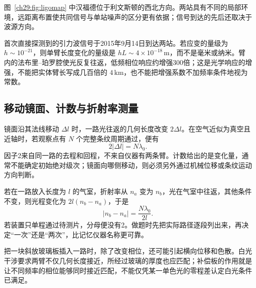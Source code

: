 图~\ref{ch29:fig:ligomap} 中汉福德位于利文斯顿的西北方向。两站具有不同的局部环境，远距离布置使共同信号与单站噪声的区分更有依据；信号到达的先后还取决于波源方向。

首次直接探测到的引力波信号于2015年9月14日到达两站。若应变的量级为 $h\sim10^{-21}$，则单臂长度变化的量级是 $hL\sim4\times10^{-18}\,\mathrm m$，而不是毫米或纳米。臂内的法布里--珀罗腔使光反复往返，低频相位响应约增强300倍；这是光学响应的增强，不能把实体臂长写成几百倍的 $4\,\mathrm{km}$，也不能把增强系数不加频率条件地视为常数。

\subsection{移动镜面、计数与折射率测量}
镜面沿其法线移动 $\Delta l$ 时，一路光往返的几何长度改变 $2\Delta l$。在空气近似为真空且近轴时，若观察点有 $N$ 个完整条纹周期通过，便有
\[
 2|\Delta l|=N\lambda_0.
\]
因子2来自同一路的去程和回程，不来自仪器有两条臂。计数给出的是变化量，通常不能确定初始绝对级次；镜面向哪侧移动，则必须另外通过机械位移或条纹运动方向判断。

若在一路放入长度为 $l$ 的气室，折射率从 $n_a$ 变为 $n_b$，光在气室中往返，其他条件不变，则光程变化为 $2l(n_b-n_a)$，于是
\[
 |n_b-n_a|=\frac{N\lambda_0}{2l}.
\]
若装置只单程通过待测片，分母便没有2。做题时先把实际路径逐段列出来，再决定“一次”还是“两次”，比记忆仪器名称更可靠。

把一块斜放玻璃板插入一路时，除了改变相位，还可能引起横向位移和色散。白光干涉要求两臂不仅几何长度接近，所经过玻璃的厚度也应匹配；补偿板的作用就是让不同频率的相位能够同时接近匹配，不能仅凭某一单色光的零程差认定白光条件已满足。








